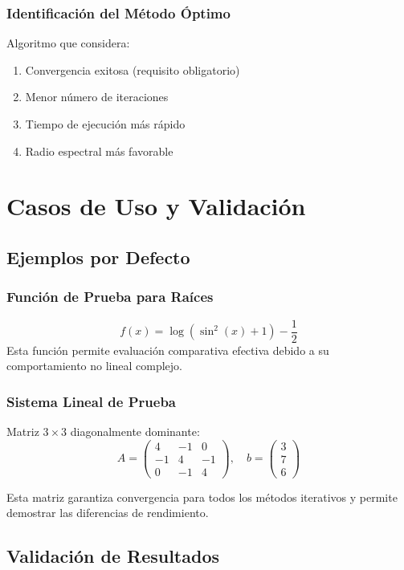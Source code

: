 \subsubsection{Identificación del Método Óptimo}
Algoritmo que considera:
\begin{enumerate}
    \item Convergencia exitosa (requisito obligatorio)
    \item Menor número de iteraciones
    \item Tiempo de ejecución más rápido
    \item Radio espectral más favorable
\end{enumerate}

\section{Casos de Uso y Validación}

\subsection{Ejemplos por Defecto}

\subsubsection{Función de Prueba para Raíces}
\[
f(x) = \log(\sin^2(x) + 1) - \frac{1}{2}
\]
Esta función permite evaluación comparativa efectiva debido a su comportamiento no lineal complejo.

\subsubsection{Sistema Lineal de Prueba}
Matriz $3 \times 3$ diagonalmente dominante:
\[
A = \begin{pmatrix}
4 & -1 & 0 \\
-1 & 4 & -1 \\
0 & -1 & 4
\end{pmatrix}, \quad b = \begin{pmatrix}
3 \\ 7 \\ 6
\end{pmatrix}
\]

Esta matriz garantiza convergencia para todos los métodos iterativos y permite demostrar las diferencias de rendimiento.

\subsection{Validación de Resultados}

